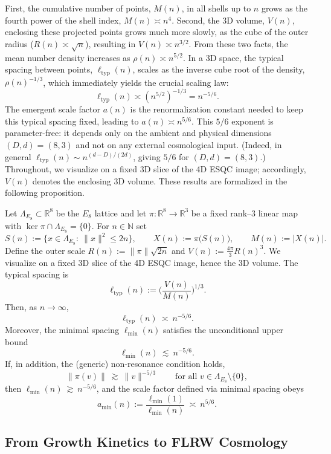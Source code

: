 \documentclass[universe,article,submit,pdftex,moreauthors]{Definitions/mdpi}
\begin{document}
First, the cumulative number of points, $M(n)$, in all shells up to $n$ grows as the fourth power of the shell index, $M(n) \asymp n^4$. Second, the 3D volume, $V(n)$, enclosing these projected points grows much more slowly, as the cube of the outer radius ($R(n) \asymp \sqrt{n}$), resulting in $V(n) \asymp n^{3/2}$. From these two facts, the mean number density increases as $\rho(n) \asymp n^{5/2}$. In a 3D space, the typical spacing between points, $\ell_{\mathrm{typ}}(n)$, scales as the inverse cube root of the density, $\rho(n)^{-1/3}$, which immediately yields the crucial scaling law:
\[
\ell_{\mathrm{typ}}(n) \asymp (n^{5/2})^{-1/3} = n^{-5/6}.
\]
The emergent scale factor $a(n)$ is the renormalization constant needed to keep this typical spacing fixed, leading to $a(n) \asymp n^{5/6}$. 
This $5/6$ exponent is parameter-free: it depends only on the ambient and physical dimensions $(D,d)=(8,3)$ and not on any external cosmological input. (Indeed, in general $\ell_{\mathrm{typ}}(n)\sim n^{(d-D)/(2d)}$, giving $5/6$ for $(D,d)=(8,3)$.)
Throughout, we visualize on a fixed 3D slice of the 4D ESQC image; accordingly, $V(n)$ denotes the enclosing 3D volume.
These results are formalized in the following proposition.

\begin{Proposition}
\label{prop:dilation-full-proj}
Let $\Lambda_{E_8}\subset\mathbb{R}^8$ be the $E_8$ lattice and let $\pi:\mathbb{R}^8\to\mathbb{R}^3$ be a fixed rank–3 linear map with $\ker\pi\cap\Lambda_{E_8}=\{0\}$. For $n\in\mathbb{N}$ set
\[
S(n):=\{x\in\Lambda_{E_8}:\ \|x\|^2\le 2n\},\qquad X(n):=\pi\big(S(n)\big),\qquad M(n):=|X(n)|.
\]
Define the outer scale $R(n):=\|\pi\|\sqrt{2n}$ and $V(n):=\tfrac{4\pi}{3}R(n)^3$. We visualize on a fixed 3D slice of the 4D ESQC image, hence the 3D volume. The typical spacing is
\[
\ell_{\mathrm{typ}}(n):=\Big(\frac{V(n)}{M(n)}\Big)^{\!1/3}.
\]
Then, as $n\to\infty$,
\[
\ell_{\mathrm{typ}}(n)\ \asymp\ n^{-5/6}.
\]
Moreover, the minimal spacing $\ell_{\min}(n)$ satisfies the unconditional upper bound
\[
\ell_{\min}(n)\ \lesssim\ n^{-5/6}.
\]
If, in addition, the (generic) non-resonance condition holds,
\[
\|\pi(v)\|\ \gtrsim\ \|v\|^{-5/3}\qquad\text{for all }v\in\Lambda_{E_8}\setminus\{0\},
\]
then $\ell_{\min}(n)\ \gtrsim\ n^{-5/6}$, and the scale factor defined via minimal spacing obeys
\[
a_{\min}(n):=\frac{\ell_{\min}(1)}{\ell_{\min}(n)}\ \asymp\ n^{5/6}.
\]
\end{Proposition}


\subsection{From Growth Kinetics to FLRW Cosmology}
\label{subsec:KineticsToFRW}
\end{document}

